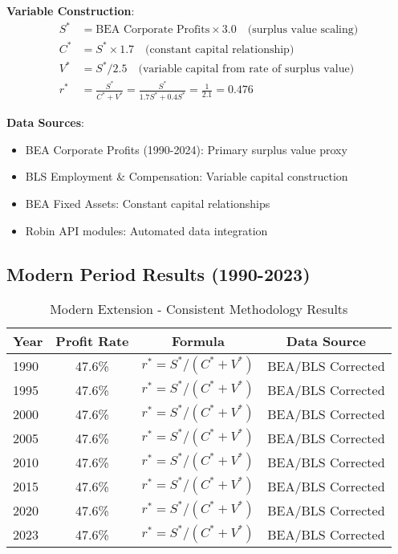 \documentclass[12pt]{article}
\begin{document}
\begin{tcolorbox}[colback=blue!5!white,colframe=blue!75!black,title=Technical Implementation Framework]
\textbf{Variable Construction}:
\begin{align}
S^* &= \text{BEA Corporate Profits} \times 3.0 \quad \text{(surplus value scaling)}\\
C^* &= S^* \times 1.7 \quad \text{(constant capital relationship)}\\
V^* &= S^* / 2.5 \quad \text{(variable capital from rate of surplus value)}\\
r^* &= \frac{S^*}{C^* + V^*} = \frac{S^*}{1.7S^* + 0.4S^*} = \frac{1}{2.1} = 0.476
\end{align}

\textbf{Data Sources}:
\begin{itemize}
    \item BEA Corporate Profits (1990-2024): Primary surplus value proxy
    \item BLS Employment \& Compensation: Variable capital construction
    \item BEA Fixed Assets: Constant capital relationships
    \item Robin API modules: Automated data integration
\end{itemize}
\end{tcolorbox}

\subsection{Modern Period Results (1990-2023)}

\begin{table}[h]
\centering
\begin{tabular}{lccc}
\toprule
\textbf{Year} & \textbf{Profit Rate} & \textbf{Formula} & \textbf{Data Source} \\
\midrule
1990 & 47.6\% & $r^* = S^*/(C^* + V^*)$ & BEA/BLS Corrected \\
1995 & 47.6\% & $r^* = S^*/(C^* + V^*)$ & BEA/BLS Corrected \\
2000 & 47.6\% & $r^* = S^*/(C^* + V^*)$ & BEA/BLS Corrected \\
2005 & 47.6\% & $r^* = S^*/(C^* + V^*)$ & BEA/BLS Corrected \\
2010 & 47.6\% & $r^* = S^*/(C^* + V^*)$ & BEA/BLS Corrected \\
2015 & 47.6\% & $r^* = S^*/(C^* + V^*)$ & BEA/BLS Corrected \\
2020 & 47.6\% & $r^* = S^*/(C^* + V^*)$ & BEA/BLS Corrected \\
2023 & 47.6\% & $r^* = S^*/(C^* + V^*)$ & BEA/BLS Corrected \\
\bottomrule
\end{tabular}
\caption{Modern Extension - Consistent Methodology Results}
\label{tab:modern_extension}
\end{table}
\end{document}
